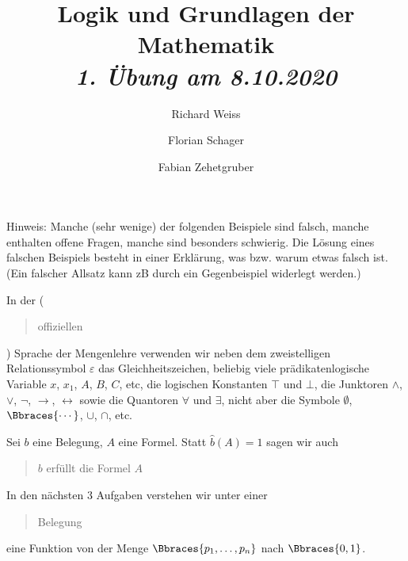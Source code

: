 \documentclass{article}
\title
{
  Logik und Grundlagen der Mathematik \\
  \vspace{4pt}
  \normalsize
  \textit{1. Übung am 8.10.2020}
}
\author
{
  Richard Weiss
  \and
  Florian Schager
  \and
  Fabian Zehetgruber
}
\date{}
\begin{document}
\maketitle

Hinweis:
Manche (sehr wenige) der folgenden Beispiele sind falsch, manche enthalten offene Fragen, manche sind besonders schwierig.
Die Lösung eines falschen Beispiels besteht in einer Erklärung, was bzw. warum etwas falsch ist.
(Ein falscher Allsatz kann zB durch ein Gegenbeispiel widerlegt werden.)




\phantom{}

In der (\blockquote{offiziellen}) Sprache der Mengenlehre verwenden wir neben dem zweistelligen Relationssymbol $\varepsilon$ das Gleichheitszeichen, beliebig viele prädikatenlogische Variable $x$, $x_1$, $A$, $B$, $C$, etc, die logischen Konstanten $\top$ und $\bot$, die Junktoren $\land$, $\lor$, $\neg$, $\to$, $\leftrightarrow$ sowie die Quantoren $\forall$ und $\exists$, nicht aber die Symbole $\emptyset$, $\Bbraces{\cdots}$, $\cup$, $\cap$, etc.







\phantom{}

Sei $b$ eine Belegung, $A$ eine Formel.
Statt $\hat{b}(A) = 1$ sagen wir auch \blockquote{$b$ erfüllt die Formel $A$}.
In den nächsten 3 Aufgaben verstehen wir unter einer \blockquote{Belegung} eine Funktion von der Menge $\Bbraces{p_1, \ldots, p_n}$ nach $\Bbraces{0, 1}$.



\end{document}
